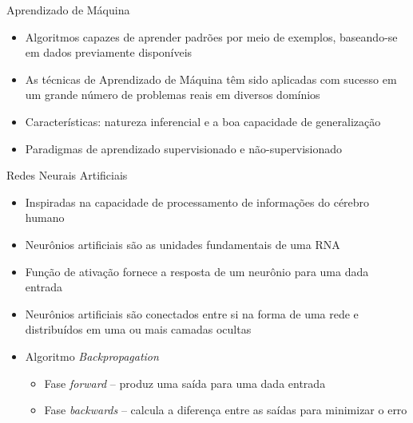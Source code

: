 

\begin{frame}{Aprendizado de Máquina}
\begin{itemize}
	\item Algoritmos capazes de aprender padrões por meio de exemplos, baseando-se em dados previamente disponíveis
	\bigskip
	\item As técnicas de \alert{Aprendizado de Máquina} têm sido aplicadas com sucesso em um grande número de problemas reais em diversos domínios
	\bigskip
	\item Características: natureza inferencial e a boa capacidade de generalização
	\bigskip
	\item Paradigmas de aprendizado supervisionado e não-supervisionado
\end{itemize}
\end{frame}

\begin{frame}{Redes Neurais Artificiais}
  \baselineskip
	\begin{itemize}
		\item Inspiradas na capacidade de processamento de informações do cérebro humano
		\bigskip
		\item \alert{Neurônios artificiais} são as unidades fundamentais de uma RNA
		\item \alert{Função de ativação} fornece a resposta de um neurônio para uma dada entrada
		\bigskip
		\item Neurônios artificiais são conectados entre si na forma de uma rede e distribuídos em uma ou mais camadas ocultas
		\bigskip
		\item Algoritmo \emph{Backpropagation}
		\begin{itemize}
			\footnotesize
			\item Fase \emph{forward} -- produz uma saída para uma dada entrada
			\item Fase \emph{backwards} -- calcula a diferença entre as saídas para minimizar o erro
		\end{itemize}
	\end{itemize}
\end{frame}

